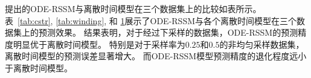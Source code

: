 \begin{table}
{\begin{tabular}{l|ll|ll|ll|ll|ll}
\bottomrule
\end{tabular}}
\label{tab:thickening}
\end{table}

提出的ODE-RSSM与离散时间模型在三个数据集上的比较如表所示。
表~\ref{tab:cstr}, \ref{tab:winding}, 和 \ref{tab:thickening}展示了ODE-RSSM与各个离散时间模型在三个数据集上的预测效果。
结果表明，对于经过下采样的数据集，ODE-RSSM的预测精度明显优于离散时间模型。
特别是对于采样率为$0.25$和$0.5$的非均匀采样数据集，离散时间模型的预测误差显著增大。
而ODE-RSSM模型预测精度的退化程度远小于离散时间模型。

